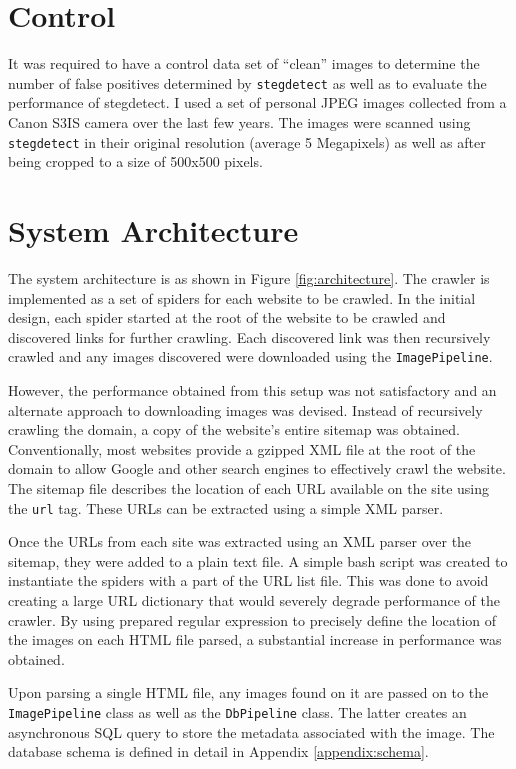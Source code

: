 \section{Control}
\label{sec:control}
It was required to have a control data set of ``clean'' images to
determine the number of false positives determined by
\texttt{stegdetect} as well as to evaluate the performance of stegdetect. I used a set of personal JPEG images collected from
a Canon S3IS camera over the last few years. The images were scanned
using \texttt{stegdetect} in their original resolution (average 5
Megapixels) as well as after
being cropped to a size of 500x500 pixels.



\section{System Architecture}
\label{sec:sysarch}
The system architecture is as shown in Figure \ref{fig:architecture}.
The crawler is implemented as a set of spiders for each website to be
crawled. In the initial design, each spider started at the root of the
website to be crawled and discovered links for further crawling. Each
discovered link was then recursively crawled and any images discovered
were downloaded using the \texttt{ImagePipeline}.

However, the performance obtained from this setup was not satisfactory
and an alternate approach to downloading images was devised. Instead of
recursively crawling the domain, a copy of the website's entire sitemap was
obtained. Conventionally, most websites provide a gzipped XML file at
the root of the domain to allow Google and other search engines to
effectively crawl the website. The sitemap file describes the location
of each URL available on the site using the \texttt{url} tag. These URLs
can be extracted using a simple XML parser.

Once the URLs from each site was extracted using an XML parser over the
sitemap, they were added to a plain text file. A simple bash script was
created to instantiate the spiders with a part of the URL list file.
This was done to avoid creating a large URL dictionary that would
severely degrade performance of the crawler. By using prepared regular expression to precisely define the
location of the images on each HTML file parsed, a substantial increase in performance was
obtained.

Upon parsing a single HTML file, any images found on it are passed
on to the \texttt{ImagePipeline} class as well as the
\texttt{DbPipeline} class. The latter creates an asynchronous SQL query
to store the metadata associated with the image. The database
schema is defined in detail in Appendix \ref{appendix:schema}.

